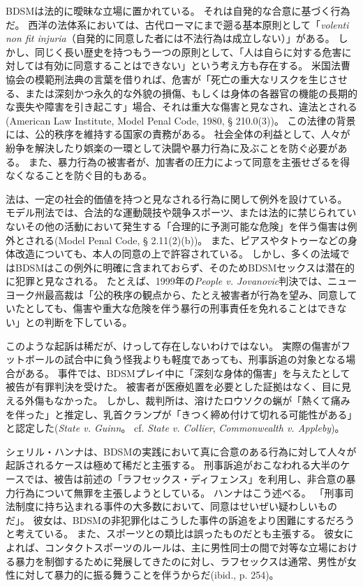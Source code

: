 \documentclass[paper=a4,book,openany]{jlreq}
\begin{document}
BDSMは法的に曖昧な立場に置かれている。
それは自発的な合意に基づく行為だ。
西洋の法体系においては、古代ローマにまで遡る基本原則として「\emph{volenti non fit injuria}（自発的に同意した者には不法行為は成立しない）」がある。
しかし、同じく長い歴史を持つもう一つの原則として、「人は自らに対する危害に対しては有効に同意することはできない」という考え方も存在する。
米国法曹協会の模範刑法典の言葉を借りれば、危害が「死亡の重大なリスクを生じさせる、または深刻かつ永久的な外貌の損傷、もしくは身体の各器官の機能の長期的な喪失や障害を引き起こす」場合、それは重大な傷害と見なされ、違法とされる(American Law Institute, Model Penal Code, 1980, § 210.0(3))。
この法律の背景には、公的秩序を維持する国家の責務がある。
社会全体の利益として、人々が紛争を解決したり娯楽の一環として決闘や暴力行為に及ぶことを防ぐ必要がある。
また、暴力行為の被害者が、加害者の圧力によって同意を主張せざるを得なくなることを防ぐ目的もある。

法は、一定の社会的価値を持つと見なされる行為に関して例外を設けている。
モデル刑法では、合法的な運動競技や競争スポーツ、または法的に禁じられていないその他の活動において発生する「合理的に予測可能な危険」を伴う傷害は例外とされる(Model Penal Code, § 2.11(2)(b))。
また、ピアスやタトゥーなどの身体改造についても、本人の同意の上で許容されている。
しかし、多くの法域ではBDSMはこの例外に明確に含まれておらず、そのためBDSMセックスは潜在的に犯罪と見なされる。
たとえば、1999年の\emph{People v. Jovanovic}判決では、ニューヨーク州最高裁は「公的秩序の観点から、たとえ被害者が行為を望み、同意していたとしても、傷害や重大な危険を伴う暴行の刑事責任を免れることはできない」との判断を下している。

このような起訴は稀だが、けっして存在しないわけではない。
実際の傷害がフットボールの試合中に負う怪我よりも軽度であっても、刑事訴追の対象となる場合がある。
事件では、BDSMプレイ中に「深刻な身体的傷害」を与えたとして被告が有罪判決を受けた。
被害者が医療処置を必要とした証拠はなく、目に見える外傷もなかった。
しかし、裁判所は、溶けたロウソクの蝋が「熱くて痛みを伴った」と推定し、乳首クランプが「きつく締め付けて切れる可能性がある」と認定した(\emph{State v. Guinn}。
cf.  \emph{State v. Collier}, \emph{Commonwealth v. Appleby})。

シェリル・ハンナは、BDSMの実践において真に合意のある行為に対して人々が起訴されるケースは極めて稀だと主張する。
刑事訴追がおこなわれる大半のケースでは、被告は前述の「ラフセックス・ディフェンス」を利用し、非合意の暴力行為について無罪を主張しようとしている。
ハンナはこう述べる。
「刑事司法制度に持ち込まれる事件の大多数において、同意はせいぜい疑わしいものだ」\citep[p.248]{hanna01:_sex_is_not_sport}。
彼女は、BDSMの非犯罪化はこうした事件の訴追をより困難にするだろうと考えている。
また、スポーツとの類比は誤ったものだとも主張する。
彼女によれば、コンタクトスポーツのルールは、主に男性同士の間で対等な立場における暴力を制御するために発展してきたのに対し、ラフセックスは通常、男性が女性に対して暴力的に振る舞うことを伴うからだ(ibid., p. 254)。
\end{document}

